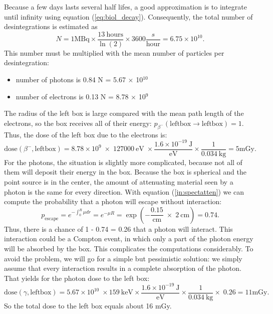 \documentclass[11pt,oneside]{article}
\begin{document}
Because a few days lasts several half lifes, a good approximation is
to integrate until infinity using equation (\ref{eq:biol_decay}).
Consequently, the total number of desintegrations is estimated as
\begin{equation}
  N = 1 \mbox{MBq} \times \frac{13\ \mbox{hours}}{\ln(2)} 
    \times 3600 \frac{s}{\mbox{hour}}
    = 6.75 \times 10^{10}.
\end{equation}
This number must be multiplied with the mean number of particles per
desintegration:
%
\begin{itemize}
  \item number of photons is 0.84 N = 5.67 $\times$ 10$^{10}$\\
  \item number of electrons is 0.13 N = 8.78 $\times$ 10$^9$
\end{itemize}
%
The radius of the left box is large compared with the mean path length
of the electrons, so the box receives all of their energy:
$p_{\beta^-}(\mbox{leftbox} \rightarrow \mbox{leftbox}) = 1$. Thus, the
dose of the left box due to the electrons is:
\begin{equation}
  \mbox{dose}(\beta^-,\mbox{leftbox}) = 8.78 \times 10^9 \; \times \; 
         127000 \ \mbox{eV} \;
    \times \frac{1.6 \times 10^{-19} \ \mbox{J}}{\mbox{eV}} \times 
          \frac{1}{0.034 \ \mbox{kg}}
      = 5 \mbox{mGy}.
\end{equation}
For the photons, the situation is slightly more complicated, because
not all of them will deposit their energy in the box. Because the box
is spherical and the point source is in the center, the amount of
attenuating material seen by a photon is the same for every direction.
With equation (\ref{jn:spectatten}) we can compute the probability that
a photon will escape without interaction:
\begin{equation}
  p_{\mbox{escape}} = e^{- \int_0^R \mu dr} = e^{- \mu R} 
     = \exp(- \frac{0.15}{\mbox{cm}} \; \times \; 2 \ \mbox{cm}) = 0.74.
\end{equation}
Thus, there is a chance of 1 - 0.74 = 0.26 that a photon will interact.
This interaction could be a Compton event, in which only a part of the
photon energy will be absorbed by the box. This complicates the computations
considerably. To avoid the problem, we will go for a simple but pessimistic
solution: we simply assume that every interaction results in a complete
absorption of the photon. That yields for the photon dose to the left box:
\begin{equation}
  \mbox{dose}(\gamma, \mbox{leftbox}) 
   =  5.67 \times 10^{10} \; \times  159\ \mbox{keV} 
    \times \frac{1.6 \times 10^{-19} \ \mbox{J}}{\mbox{eV}}
    \times \frac{1}{0.034 \ \mbox{kg}} \times \; 0.26 = 11 \mbox{mGy}.
\end{equation}
So the total dose to the left box equals about 16 mGy.
\end{document}
